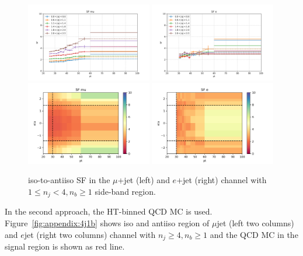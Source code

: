 \begin{figure}
    \centering
    \includegraphics[width=0.49\textwidth]{chapters/Appendix/sectionQCD/figures/123j1b/SF_mu_1d.png}
    \includegraphics[width=0.49\textwidth]{chapters/Appendix/sectionQCD/figures/123j1b/SF_e_1d.png}
    \includegraphics[width=0.49\textwidth]{chapters/Appendix/sectionQCD/figures/123j1b/SF_mu_2d.png}
    \includegraphics[width=0.49\textwidth]{chapters/Appendix/sectionQCD/figures/123j1b/SF_e_2d.png}

    \caption{iso-to-antiiso SF in the $\mu$+jet (left) and $e$+jet (right) channel 
    with $1\leq n_j <4, n_b\geq1$ side-band region.}
    \label{fig:appendix:123j1b_sf}
\end{figure}


In the second approach, the HT-binned QCD MC is used. Figure~\ref{fig:appendix:4j1b} shows iso and antiiso region of $\mu$jet (left two columns) and $e$jet (right two columns) channel
with $n_j\geq4,n_b\geq1$ and the QCD MC in the signal region is shown as red line.

